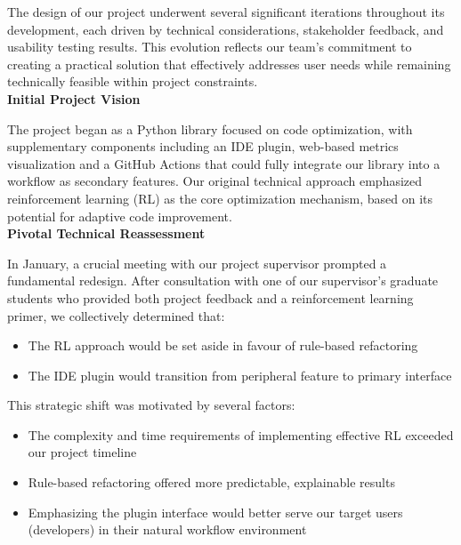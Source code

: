 \documentclass{article}
\begin{document}

The design of our project underwent several significant iterations throughout its development, each driven by technical considerations, stakeholder feedback, and usability testing results. This evolution reflects our team's commitment to creating a practical solution that effectively addresses user needs while remaining technically feasible within project constraints.\\


\noindent \textbf{Initial Project Vision}

\noindent
The project began as a Python library focused on code optimization, with supplementary components including an IDE plugin, web-based metrics visualization and a GitHub Actions that could fully integrate our library into a workflow as secondary features. Our original technical approach emphasized reinforcement learning (RL) as the core optimization mechanism, based on its potential for adaptive code improvement.\\


\noindent \textbf{Pivotal Technical Reassessment}

\noindent
In January, a crucial meeting with our project supervisor prompted a fundamental redesign. After consultation with one of our supervisor's graduate students who provided both project feedback and a reinforcement learning primer, we collectively determined that:

\begin{itemize}
    \item The RL approach would be set aside in favour of rule-based refactoring
    \item The IDE plugin would transition from peripheral feature to primary interface
\end{itemize}

This strategic shift was motivated by several factors:
\begin{itemize}
    \item The complexity and time requirements of implementing effective RL exceeded our project timeline
    \item Rule-based refactoring offered more predictable, explainable results
    \item Emphasizing the plugin interface would better serve our target users (developers) in their natural workflow environment
\end{itemize}
\end{document}
